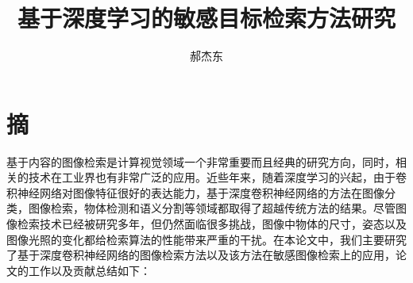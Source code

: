 

\confidential{} %
\title[基于深度学习的敏感目标检索方法研究]{基于深度学习的敏感目标检索方法研究}
\author{郝杰东} %
\advisorsec{} %



\maketitle
\makeenglishtitle

\makedeclaration

\chapter*{摘}
\setcounter{page}{1}%
基于内容的图像检索是计算视觉领域一个非常重要而且经典的研究方向，同时，相关的技术在工业界也有非常广泛的应用。近些年来，随着深度学习的兴起，由于卷积神经网络对图像特征很好的表达能力，基于深度卷积神经网络的方法在图像分类，图像检索，物体检测和语义分割等领域都取得了超越传统方法的结果。尽管图像检索技术已经被研究多年，但仍然面临很多挑战，图像中物体的尺寸，姿态以及图像光照的变化都给检索算法的性能带来严重的干扰。在本论文中，我们主要研究了基于深度卷积神经网络的图像检索方法以及该方法在敏感图像检索上的应用，论文的工作以及贡献总结如下：

